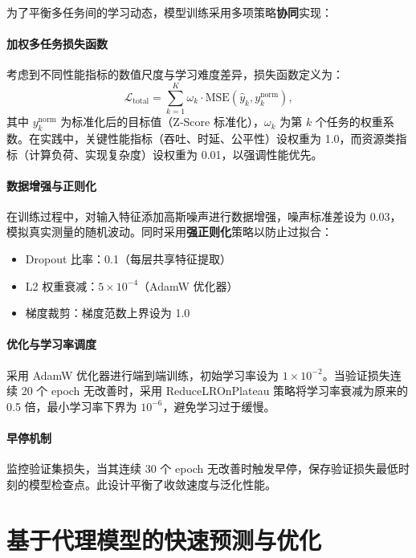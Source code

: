 为了平衡多任务间的学习动态，模型训练采用多项策略\textbf{协同}实现：

\paragraph{加权多任务损失函数}
考虑到不同性能指标的数值尺度与学习难度差异，损失函数定义为：
\begin{equation}
	\mathcal{L}_{\text{total}} = \sum_{k=1}^{K} \omega_k \cdot \text{MSE}(\hat{y}_k, y_k^{\text{norm}}),
\end{equation}
其中 $y_k^{\text{norm}}$ 为标准化后的目标值（Z-Score 标准化），$\omega_k$ 为第 $k$ 个任务的权重系数。在实践中，关键性能指标（吞吐、时延、公平性）设权重为 1.0，而资源类指标（计算负荷、实现复杂度）设权重为 0.01，以强调性能优先。

\paragraph{数据增强与正则化}
在训练过程中，对输入特征添加高斯噪声进行数据增强，噪声标准差设为 0.03，模拟真实测量的随机波动。同时采用\textbf{强正则化}策略以防止过拟合：
\begin{itemize}[leftmargin=*]
\item Dropout 比率：0.1（每层共享特征提取）
\item L2 权重衰减：$5 \times 10^{-4}$（AdamW 优化器）
\item 梯度裁剪：梯度范数上界设为 1.0
\end{itemize}

\paragraph{优化与学习率调度}
采用 AdamW 优化器进行端到端训练，初始学习率设为 $1 \times 10^{-2}$。当验证损失连续 20 个 epoch 无改善时，采用 ReduceLROnPlateau 策略将学习率衰减为原来的 0.5 倍，最小学习率下界为 $10^{-6}$，避免学习过于缓慢。

\paragraph{早停机制}
监控验证集损失，当其连续 30 个 epoch 无改善时触发早停，保存验证损失最低时刻的模型检查点。此设计平衡了收敛速度与泛化性能。


\section{基于代理模型的快速预测与优化}

